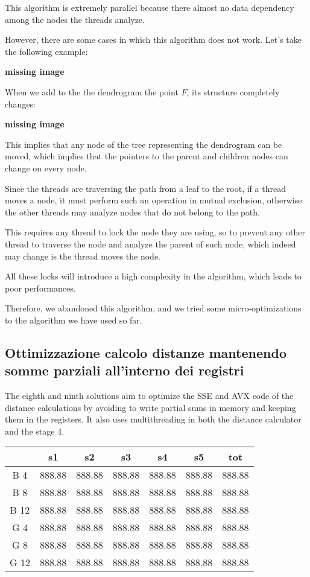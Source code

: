 \documentclass{article}
\newcommand{\loremTableShort}{
    \begin{table}[H]
        \centering
        \begin{tabular}[H]{ccccccc}
            \hline
            & s1     & s2     & s3     & s4     & s5     & tot    \\
            \hline
            B 4  & 888.88 & 888.88 & 888.88 & 888.88 & 888.88 & 888.88 \\
            B 8  & 888.88 & 888.88 & 888.88 & 888.88 & 888.88 & 888.88 \\
            B 12 & 888.88 & 888.88 & 888.88 & 888.88 & 888.88 & 888.88 \\
            G 4  & 888.88 & 888.88 & 888.88 & 888.88 & 888.88 & 888.88 \\
            G 8  & 888.88 & 888.88 & 888.88 & 888.88 & 888.88 & 888.88 \\
            G 12 & 888.88 & 888.88 & 888.88 & 888.88 & 888.88 & 888.88 \\
            \hline
        \end{tabular}
        \label{tab:my_label}
    \end{table}
}
\begin{document}
This algorithm is extremely parallel because there almost no data dependency among the nodes the
threads analyze.

However, there are some cases in which this algorithm does not work. Let's take the following
example:

\textbf{missing image}

When we add to the the dendrogram the point $F$, its structure completely changes:

\textbf{missing image}

This implies that any node of the tree representing the dendrogram can be moved, which implies
that the pointers to the parent and children nodes can change on every node.

Since the threads are traversing the path from a leaf to the root, if a thread moves a node, it
must perform such an operation in mutual exclusion, otherwise the other threads may analyze nodes
that do not belong to the path.

This requires any thread to lock the node they are using, so to prevent any other thread to
traverse the node and analyze the parent of such node, which indeed may change is the thread
moves the node.

All these locks will introduce a high complexity in the algorithm, which leads to poor performances.

Therefore, we abandoned this algorithm, and we tried some micro-optimizations to the algorithm we
have used so far.

\hypertarget{micro-optimization-partial-sum}{%
    \subsection{Ottimizzazione calcolo distanze mantenendo somme parziali
    all'interno dei
    registri}\label{micro-optimization-partial-sum}}



The eighth and ninth solutions aim to optimize the SSE and AVX code of
the distance calculations by avoiding to write partial sums in memory
and keeping them in the registers. It also uses multithreading in both
the distance calculator and the stage 4.

\loremTableShort

\end{document}
